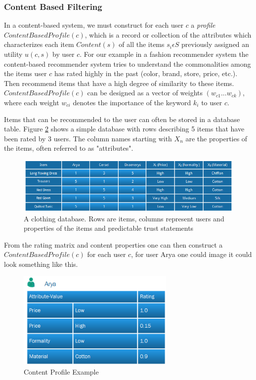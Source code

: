 \subsubsection{Content Based Filtering}

In a content-based system, we must construct for each user $c$ a \emph{profile} $ContentBasedProfile(c)$, which is a record or collection of the attributes which characterizes each item $Content(s)$ of all the items $s_{i} \epsilon S$ previously assigned an utility $u(c, s)$ by user $c$. For our example in a fashion recommender system the content-based recommender system tries to understand the commonalities among the items user $c$ has rated highly in the past (color, brand, store, price, etc.). Then recommend items that have a high degree of similarity to these items. $ContentBasedProfile(c)$ can be designed as a vector of weights $(w_{c1} ... w_{ck})$, where each weight $w_{ci}$ denotes the importance of the keyword $k_{i}$ to user $c$.

Items that can be recommended to the user can often be stored in a database table. Figure \ref{figure:contentbaseddb} shows a simple database with rows describing 5 items that have been rated by 3 users. The column names starting with $X_{n}$ are the properties of the items, often referred to as "attributes".

\begin{figure}[H]
    \includegraphics[width=5in]{image/contentbaseddb.png}
    \centering
    \caption[A clothing database]{A clothing database. Rows are items, columns represent users and properties of the items and predictable trust statements}
    \label{figure:contentbaseddb}
\end{figure}

From the rating matrix and content properties one can then construct a $ContentBasedProfile(c)$ for each user $c$, for user Arya one could image it could look something like this.

\begin{figure}[H]
    \includegraphics[width=3in]{image/contentprofile.png}
    \centering
    \caption[Content Profile Example]{Content Profile Example}
    \label{figure:contentbaseddb}
\end{figure}

